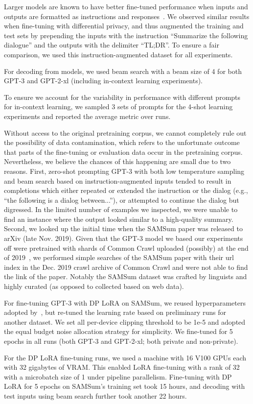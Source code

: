 Larger models are known to have better fine-tuned performance when inputs and outputs are formatted as instructions and responses~\citep{wei2021finetuned,sanh2021multitask}. 
We observed similar results when fine-tuning with differential privacy, and thus augmented the training and test sets by prepending the inputs with the instruction ``Summarize the following dialogue'' and the outputs with the delimiter ``TL;DR''. 
To ensure a fair comparison, we used this instruction-augmented dataset for all experiments. 

For decoding from models, we used beam search with a beam size of 4 for both GPT-3 and GPT-2-xl (including in-context learning experiments). 

To ensure we account for the variability in performance with different prompts for in-context learning, we sampled 3 sets of prompts for the 4-shot learning experiments and reported the average metric over runs. 

Without access to the original pretraining corpus, we cannot completely rule out the possibility of data contamination, which refers to the unfortunate outcome that parts of the fine-tuning or evaluation data occur in the pretraining corpus.
Nevertheless, we believe the chances of this happening are small due to two reasons. 
First, zero-shot prompting GPT-3 with both low temperature sampling and beam search based on instruction-augmented inputs tended to result in completions which either repeated or extended the instruction or the dialog (e.g., ``the following is a dialog between...''), or attempted to continue the dialog but digressed. 
In the limited number of examples we inspected, we were unable to find an instance where the output looked similar to a high-quality summary. Second, we looked up the initial time when the SAMSum paper was released to arXiv (late Nov. 2019). 
Given that the GPT-3 model we based our experiments off were pretrained with shards of Common Crawl uploaded (possibly) at the end of 2019~\citep{brown2020language}, we performed simple searches of the SAMSum paper with their url index in the Dec. 2019 crawl archive of Common Crawl and were not able to find the link of the paper.
Notably the SAMSum dataset was crafted by linguists and highly curated (as opposed to collected based on web data). 

For fine-tuning GPT-3 with DP LoRA on SAMSum, we reused hyperparameters adopted by~\cite{hu2021lora}, but re-tuned the learning rate based on preliminary runs for another dataset.
We set all per-device clipping threshold to be 1e-5 and adopted the equal budget noise allocation strategy for simplicity. 
We fine-tuned for 5 epochs in all runs (both GPT-3 and GPT-2-xl; both private and non-private).

For the DP LoRA fine-tuning runs, we used a machine with 16 V100 GPUs each with 32 gigabytes of VRAM. 
This enabled LoRA fine-tuning with a rank of 32 with a microbatch size of 1 under pipeline parallelism.
Fine-tuning with DP LoRA for 5 epochs on SAMSum's training set took 15 hours, and decoding with test inputs using beam search further took another 22 hours. 


